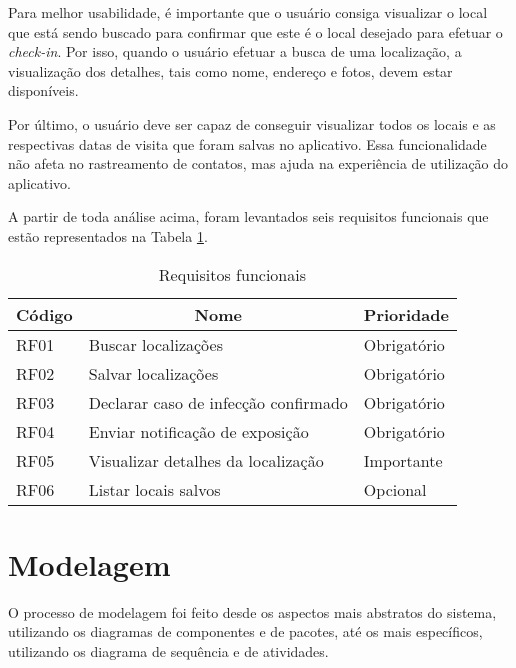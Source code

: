 Para melhor usabilidade, é importante que o usuário consiga visualizar o local que está sendo buscado para confirmar que este é o local desejado para efetuar o \textit{check-in}. Por isso, quando o usuário efetuar a busca de uma localização, a visualização dos detalhes, tais como nome, endereço e fotos, devem estar disponíveis. 

Por último, o usuário deve ser capaz de conseguir visualizar todos os locais e as respectivas datas de visita que foram salvas no aplicativo. Essa funcionalidade não afeta no rastreamento de contatos, mas ajuda na experiência de utilização do aplicativo.

A partir de toda análise acima, foram levantados seis requisitos funcionais que estão representados na Tabela \ref{tab:tabelaf}.

\begin{table}[!htb]
\caption[Tabela de requisitos funcionais]{Requisitos funcionais}
\label{tab:tabelaf}
\begin{center}
\begin{tabular}{|l|l|l|}
\hline
\multicolumn{1}{|c|}{\textbf{Código}} & \multicolumn{1}{c|}{\textbf{Nome}}   & \multicolumn{1}{c|}{\textbf{Prioridade}} \\ \hline
RF01                                  & Buscar localizações                  & Obrigatório                              \\ \hline
RF02                                  & Salvar localizações                  & Obrigatório                              \\ \hline
RF03                                  & Declarar caso de infecção confirmado & Obrigatório                              \\ \hline
RF04                                  & Enviar notificação de exposição      & Obrigatório                              \\ \hline
RF05                                  & Visualizar detalhes da localização   & Importante                               \\ \hline
RF06                                  & Listar locais salvos                 & Opcional                                 \\ \hline
\end{tabular}
\end{center}
\end{table}

\section{Modelagem}\label{sec:modelagem}
O processo de modelagem foi feito desde os aspectos mais abstratos do sistema, utilizando os diagramas de componentes e de pacotes, até os mais específicos, utilizando os diagrama de sequência e de atividades.

